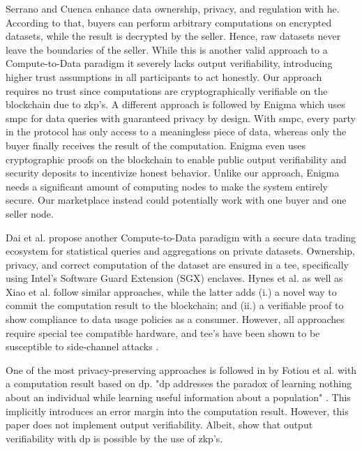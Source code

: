 Serrano and Cuenca \cite{serranoPeertoPeerOwnershipPreservingData2021} enhance data ownership, privacy, and regulation with \acrfull{he}. According to that, buyers can perform arbitrary computations on encrypted datasets, while the result is decrypted by the seller. Hence, raw datasets never leave the boundaries of the seller. While this is another valid approach to a Compute-to-Data paradigm it severely lacks output verifiability, introducing higher trust assumptions in all participants to act honestly. Our approach requires no trust since computations are cryptographically verifiable on the blockchain due to \acrshort{zkp}'s. A different approach is followed by Enigma \cite{shrobeEnigmaDecentralizedComputation2018} which uses \acrfull{smpc} for data queries with guaranteed privacy by design. With \acrshort{smpc}, every party in the protocol has only access to a meaningless piece of data, whereas only the buyer finally receives the result of the computation. Enigma even uses cryptographic proofs on the blockchain to enable public output verifiability and security deposits to incentivize honest behavior. Unlike our approach, Enigma needs a significant amount of computing nodes to make the system entirely secure. Our marketplace instead could potentially work with one buyer and one seller node.

Dai et al. propose another Compute-to-Data paradigm with a secure data trading ecosystem \cite{daiSDTESecureBlockchainBased2020} for statistical queries and aggregations on private datasets. Ownership, privacy, and correct computation of the dataset are ensured in a \acrfull{tee}, specifically using Intel’s Software Guard Extension (SGX) enclaves. Hynes et al. \cite{hynesDemonstrationSterlingPrivacypreserving2018a} as well as Xiao et al. \cite{xiaoPrivacyGuardEnforcingPrivate2020} follow similar approaches, while the latter adds (i.) a novel way to commit the computation result to the blockchain; and (ii.) a verifiable proof to show compliance to data usage policies as a consumer. However, all approaches require special \acrshort{tee} compatible hardware, and \acrshort{tee}'s have been shown to be susceptible to side-channel attacks \cite{brasserSoftwareGrandExposure,biondoGuardDilemmaEfficient}.

One of the most privacy-preserving approaches is followed in \cite{fotiouPrivacypreservingStatisticsMarketplace2021} by Fotiou et al. with a computation result based on \acrfull{dp}. "\acrshort{dp} addresses the paradox of learning nothing about an individual while learning useful information about a population" \cite{tsaloliDifferentialPrivacyMeets}. This implicitly introduces an error margin into the computation result. However, this paper does not implement output verifiability. Albeit, \cite{narayanVerifiableDifferentialPrivacy2015,tsaloliDifferentialPrivacyMeets,koutsosAgoraPrivacyAwareData} show that output verifiability with \acrshort{dp} is possible by the use of \acrshort{zkp}'s.

